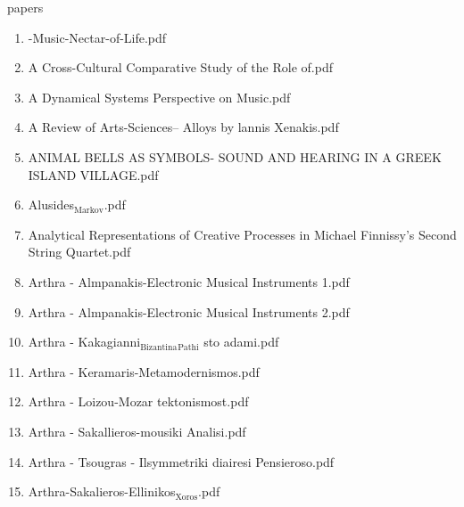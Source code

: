 \documentclass[11pt]{article}
\begin{document}
\item papers
\label{sec-1-1-1-1-11-19-27}
\begin{enumerate}
\item -Music-Nectar-of-Life.pdf
\label{sec-1-1-1-1-11-19-27-1}

\item A Cross-Cultural Comparative Study of the Role of.pdf
\label{sec-1-1-1-1-11-19-27-2}

\item A Dynamical Systems Perspective on Music.pdf
\label{sec-1-1-1-1-11-19-27-3}

\item A Review of Arts-Sciences-- Alloys by lannis Xenakis.pdf
\label{sec-1-1-1-1-11-19-27-4}

\item ANIMAL BELLS AS SYMBOLS- SOUND AND HEARING IN A GREEK ISLAND VILLAGE.pdf
\label{sec-1-1-1-1-11-19-27-5}

\item Alusides$_{\text{Markov}}$.pdf
\label{sec-1-1-1-1-11-19-27-6}

\item Analytical Representations of Creative Processes in Michael Finnissy’s Second String Quartet.pdf
\label{sec-1-1-1-1-11-19-27-7}

\item Arthra - Almpanakis-Electronic Musical Instruments 1.pdf
\label{sec-1-1-1-1-11-19-27-8}

\item Arthra - Almpanakis-Electronic Musical Instruments 2.pdf
\label{sec-1-1-1-1-11-19-27-9}

\item Arthra - Kakagianni$_{\text{Bizantina}}$$_{\text{Pathi}}$ sto adami.pdf
\label{sec-1-1-1-1-11-19-27-10}

\item Arthra - Keramaris-Metamodernismos.pdf
\label{sec-1-1-1-1-11-19-27-11}

\item Arthra - Loizou-Mozar tektonismost.pdf
\label{sec-1-1-1-1-11-19-27-12}

\item Arthra - Sakallieros-mousiki Analisi.pdf
\label{sec-1-1-1-1-11-19-27-13}

\item Arthra - Tsougras - Ilsymmetriki diairesi  Pensieroso.pdf
\label{sec-1-1-1-1-11-19-27-14}

\item Arthra-Sakalieros-Ellinikos$_{\text{Xoros}}$.pdf
\label{sec-1-1-1-1-11-19-27-15}


\end{enumerate}
\end{document}
